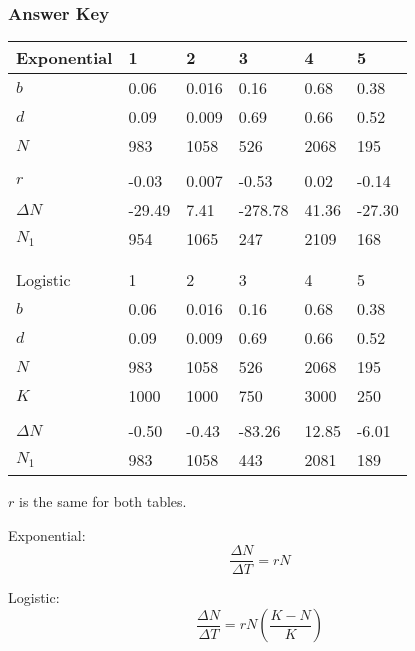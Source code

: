 \documentclass[12pt]{exam}
\begin{document}
\newpage

\subsubsection*{Answer Key}

\begin{longtable}[l]{@{}R{1in}R{0.75in}R{0.75in}R{0.75in}R{0.75in}R{0.75in}@{}}	
	\toprule
	Exponential	& 1	& 2	& 3	& 4	& 5 \tabularnewline
	\midrule
	$b$	& 0.06	& 0.016	& 0.16	& 0.68	& 0.38 \tabularnewline
	$d$	& 0.09	& 0.009	& 0.69	& 0.66	& 0.52 \tabularnewline
	$N$	& 983	& 1058	& 526	& 2068	& 195 \tabularnewline
	& 	& 	& 	& 	&  \tabularnewline
	$r$	& -0.03	& 0.007	& -0.53	& 0.02	& -0.14 \tabularnewline
	$\Delta N$	& -29.49	& 7.41	& -278.78	& 41.36	& -27.30 \tabularnewline
	$N_1$	& 954	& 1065	& 247	& 2109	& 168 \tabularnewline
	\bottomrule
	& 	& 	& 	& 	&  \tabularnewline 
	& 	& 	& 	& 	&  \tabularnewline 
	\toprule
	Logistic	& 1	& 2	& 3	& 4	& 5 \tabularnewline
	\midrule
	$b$	& 0.06	& 0.016	& 0.16	& 0.68	& 0.38 \tabularnewline
	$d$	& 0.09	& 0.009	& 0.69	& 0.66	& 0.52 \tabularnewline
	$N$	& 983	& 1058	& 526	& 2068	& 195 \tabularnewline
	$K$	& 1000	& 1000	& 750	& 3000	& 250 \tabularnewline
	& 	& 	& 	& 	&  \tabularnewline
	$\Delta N$	& -0.50	& -0.43	& -83.26	& 12.85	& -6.01 \tabularnewline
	$N_1$	& 983	& 1058	& 443	& 2081	& 189 \tabularnewline
	\bottomrule
	
\end{longtable}

	\bigskip
	
	$r$ is the same for both tables.
	
	\bigskip
	
	Exponential:
	\begin{equation*}
	\dfrac{\Delta N}{\Delta T} = rN 
	\end{equation*}
	
	\bigskip
	
	Logistic:
	\begin{equation*}
	\dfrac{\Delta N}{\Delta T} = rN\left(\dfrac{K-N}{K}\right)
	\end{equation*}
\end{document}
